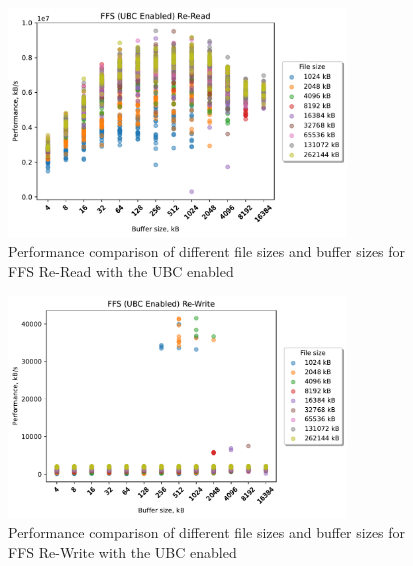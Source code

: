 \begin{figure}[!htb]
	\label{fig:bench_ffs_ubc_scatter_re-read}
	\begin{center}
		\includegraphics[width=0.8\textwidth]{figures.nosync/benchmarking/FFS/scatter-UBC Enabled-Re-Read.pdf}
	\end{center}
	\caption[Comparison of Re-Read performance for file size and buffer size for FFS with the UBC enabled]{Performance comparison of different file sizes and buffer sizes for FFS Re-Read with the UBC enabled}
\end{figure}
\begin{figure}[!htb]
	\label{fig:bench_ffs_ubc_scatter_re-write}
	\begin{center}
		\includegraphics[width=0.8\textwidth]{figures.nosync/benchmarking/FFS/scatter-UBC Enabled-Re-Write.pdf}
	\end{center}
	\caption[Comparison of Re-Write performance for file size and buffer size for FFS with the UBC enabled]{Performance comparison of different file sizes and buffer sizes for FFS Re-Write with the UBC enabled}
\end{figure}
\clearpage
